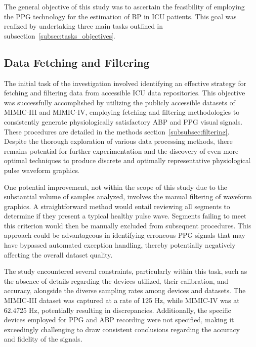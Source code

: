 The general objective of this study was to ascertain the feasibility of employing the PPG technology for the estimation of BP in ICU patients.
This goal was realized by undertaking three main tasks outlined in subsection~\ref{subsec:tasks_objectives}.

\vspace{-0.5cm}
\subsection{Data Fetching and Filtering}
\label{subsec:data-fetching-and-filtering}

The initial task of the investigation involved identifying an effective strategy for fetching and filtering data from accessible ICU data repositories.
This objective was successfully accomplished by utilizing the publicly accessible datasets of MIMIC-III and MIMIC-IV,
employing fetching and filtering methodologies to consistently generate physiologically satisfactory ABP and PPG visual signals.
These procedures are detailed in the methods section~\ref{subsubsec:filtering}.
Despite the thorough exploration of various data processing methods, there remains potential for further experimentation and the discovery of even more optimal techniques
to produce discrete and optimally representative physiological pulse waveform graphics.

One potential improvement, not within the scope of this study due to the substantial volume of samples analyzed, involves the manual filtering of waveform graphics.
A straightforward method would entail reviewing all segments to determine if they present a typical healthy pulse wave.
Segments failing to meet this criterion would then be manually excluded from subsequent procedures.
This approach could be advantageous in identifying erroneous PPG signals that may have bypassed automated exception handling, thereby potentially negatively affecting the overall dataset quality.

The study encountered several constraints, particularly within this task, such as the absence of details regarding the devices utilized,
their calibration, and accuracy, alongside the diverse sampling rates among devices and datasets.
The MIMIC-III dataset was captured at a rate of 125 Hz, while MIMIC-IV was at 62.4725 Hz, potentially resulting in discrepancies.
Additionally, the specific devices employed for PPG and ABP recording were not specified, making it exceedingly challenging to draw consistent conclusions regarding the accuracy and fidelity of the signals.

